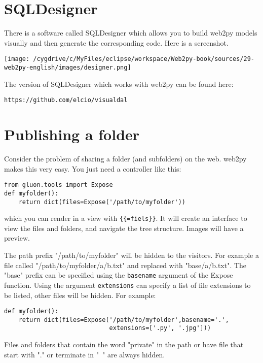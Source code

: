 \documentclass[justified,sixbynine,notoc]{tufte-book}
\def\ft{\small\tt}
\begin{document}
\begin{fullwidth}
\goodbreak\section{SQLDesigner}

There is a software called SQLDesigner which allows you to build web2py models visually and then generate the corresponding code. Here is a screenshot.


\goodbreak\begin{center}\texttt{[image: /cygdrive/c/MyFiles/eclipse/workspace/Web2py-book/sources/29-web2py-english/images/designer.png]}\end{center}


The version of SQLDesigner which works with web2py can be found here:

{\ft https://github.com/elcio/visualdal}

\goodbreak\section{Publishing a folder}

Consider the problem of sharing a folder (and subfolders) on the web. web2py makes this very easy. You just need a controller like this:

\begin{lstlisting}
from gluon.tools import Expose
def myfolder():
    return dict(files=Expose('/path/to/myfolder'))
\end{lstlisting}
\noindent which you can render in a view with {\ft \{\{=fiels\}\}}. It will create an interface to view the files and folders, and navigate the tree structure. Images will have a preview.

The path prefix "/path/to/myfolder" will be hidden to the visitors. For example a file called "/path/to/myfolder/a/b.txt" and replaced with "base/a/b.txt". The "base" prefix can be specified using the {\ft basename} argument of the Expose function. Using the argument {\ft extensions} can specify a list of file extensions to be listed, other files will be hidden. For example:

\begin{lstlisting}
def myfolder():
    return dict(files=Expose('/path/to/myfolder',basename='.',
                             extensions=['.py', '.jpg']))
\end{lstlisting}

Files and folders that contain the word "private" in the path or have file that start with "." or terminate in "~" are always hidden.


\end{fullwidth}
\end{document}
